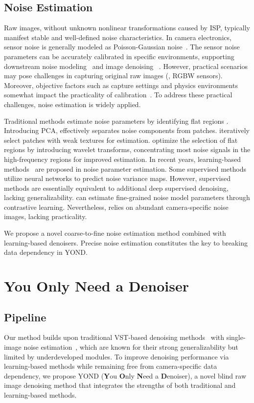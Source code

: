 \documentclass[lettersize,journal]{IEEEtran}
\begin{document}
	\subsection{Noise Estimation}
	Raw images, without unknown nonlinear transformations caused by ISP, typically manifest stable and well-defined noise characteristics. In camera electronics, sensor noise is generally modeled as Poisson-Gaussian noise~\cite{P-G}. The sensor noise parameters can be accurately calibrated in specific environments, supporting downstream noise modeling~\cite{TPAMI94/CCD, P-G, TIP17/PMM, CVPR20/ELD, TPAMI21/ELD, TPAMI23/PMN} and image denoising ~\cite{NLM, BM3D, TIP18/FFDNet, CVPR19/CBDNet, CVPR21/FBI}. However, practical scenarios may pose challenges in capturing original raw images (\eg, RGBW sensors). Moreover, objective factors such as capture settings and physics environments somewhat impact the practicality of calibration~\cite{TPAMI23/PMN}. To address these practical challenges, noise estimation is widely applied.
	
	Traditional methods estimate noise parameters by identifying flat regions \cite{meer1990fast, immerkaer1996fast}. Introducing PCA, \cite{TIP12/PCA} effectively separates noise components from patches. \cite{ICIP13/Liu} iteratively select patches with weak textures for estimation. \cite{P-G, TIP21/DWTNE} optimize the selection of flat regions by introducing wavelet transforms, concentrating most noise signals in the high-frequency regions for improved estimation. In recent years, learning-based methods~\cite{TIP18/FFDNet,CVPR19/CBDNet,CVPR21/FBI,CVPR22/FG-ELD,ICCV23/DCD} are proposed in noise parameter estimation. Some supervised methods~\cite{TIP18/FFDNet,CVPR19/CBDNet} utilize neural networks to predict noise variance maps. However, supervised methods are essentially equivalent to additional deep supervised denoising, lacking generalizability. \cite{CVPR22/FG-ELD} can estimate fine-grained noise model parameters through contrastive learning. Nevertheless, relies on abundant camera-specific noise images, lacking practicality.
	
	We propose a novel coarse-to-fine noise estimation method combined with learning-based denoisers. Precise noise estimation constitutes the key to breaking data dependency in YOND.
	
	\section{You Only Need a Denoiser}
	\subsection{Pipeline}
	Our method builds upon traditional VST-based denoising methods~\cite{PGD-VST12,TIP13/VST,BM3D} with single-image noise estimation~\cite{P-G,ICIP13/Liu}, which are known for their strong generalizability but limited by underdeveloped modules. To improve denoising performance via learning-based methods while remaining free from camera-specific data dependency, we propose YOND (\textbf{Y}ou \textbf{O}nly \textbf{N}eed a \textbf{D}enoiser), a novel blind raw image denoising method that integrates the strengths of both traditional and learning-based methods.
	
\end{document}
